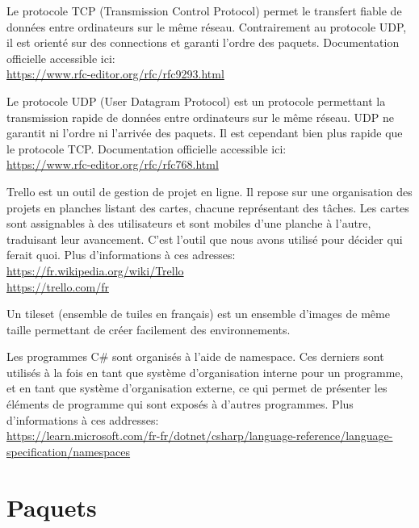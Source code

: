 \documentclass[a4paper]{article}
\begin{document}
\begin{thebibliography}{}
    Le protocole TCP (Transmission Control Protocol) permet le transfert fiable de données entre ordinateurs sur le même réseau. Contrairement au protocole UDP, il est orienté sur des connections et garanti l'ordre des paquets. Documentation officielle accessible ici: \\
    \url{https://www.rfc-editor.org/rfc/rfc9293.html}
    
    Le protocole UDP (User Datagram Protocol) est un protocole permettant la transmission rapide de données entre ordinateurs sur le même réseau. UDP ne garantit ni l'ordre ni l'arrivée des paquets. Il est cependant bien plus rapide que le protocole TCP. Documentation officielle accessible ici: \\
    \url{https://www.rfc-editor.org/rfc/rfc768.html}
    
	Trello est un outil de gestion de projet en ligne. Il repose sur une organisation des projets en planches listant des cartes, chacune représentant des tâches. Les cartes sont assignables à des utilisateurs et sont mobiles d'une planche à l'autre, traduisant leur avancement. C'est l'outil que nous avons utilisé pour décider qui ferait quoi. Plus d'informations à ces adresses: \\
    \url{https://fr.wikipedia.org/wiki/Trello} \\
    \url{https://trello.com/fr}
    
	Un tileset (ensemble de tuiles en français) est un ensemble d'images de même taille permettant de créer facilement des environnements.
    
  Les programmes C\# sont organisés à l’aide de namespace. Ces derniers sont utilisés à la fois en tant que système d’organisation interne pour un programme, et en tant que système d’organisation externe, ce qui permet de présenter les éléments de programme qui sont exposés à d’autres programmes. Plus d'informations à ces addresses: \\
  \url{https://learn.microsoft.com/fr-fr/dotnet/csharp/language-reference/language-specification/namespaces}

\end{thebibliography}






\newpage
\appendix
\section{Paquets}
\label{annexe:paquets}
\end{document}
